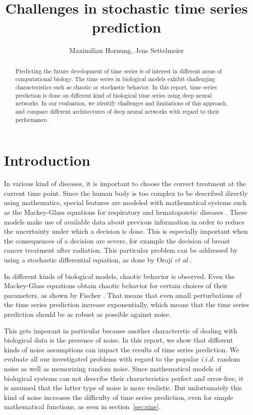 \documentclass{article}
\title{Challenges in stochastic time series prediction}
\author{Maximilian Hornung, Jens Settelmeier}
\begin{document}
\maketitle

\begin{abstract}
  Predicting the future development of time series is of interest in different
  areas of computational biology. The time series in biological models exhibit
  challenging characteristics such as chaotic or stochastic behavior. In this
  report, time series prediction is done on different kind of biological time
  series using deep neural networks. In our evaluation, we identify challenges
  and limitations of this approach, and compare different architectures of
  deep neural networks with regard to their performance.
\end{abstract}

\section{Introduction}

In various kind of diseases, it is important to choose the correct treatment at
the current time point. Since the human body is too complex to be described
directly using mathematics, special features are modeled with mathematical
systems such as the Mackey-Glass equations for respiratory and hematopoietic
diseases \cite{mackey1977}. These models make use of available data about
previous information in order to reduce the uncertainty under which a decision
is done. This is especially important when the consequences of a decision are
severe, for example the decision of breast cancer treatment after radiation.
This particular problem can be addressed by using a stochastic differential
equation, as done by Oroji \textit{et al} \cite{oroji2016}.

In different kinds of biological models, chaotic behavior is observed. Even the
Mackey-Glass equations obtain chaotic behavior for certain choices of their
parameters, as shown by Fischer \cite{farmer1982}. That means that even small
perturbations of the time series prediction increase exponentially, which means
that the time series prediction should be as robust as possible against noise.

This gets imporant in particular because another characterstic of dealing with
biological data is the presence of noise. In
this report, we show that different kinds of noise assumptions can impact the
results of time series prediction. We evaluate all our investigated problems
with regard to the popular $i.i.d.$ random noise as well as memorizing random
noise. Since mathematical models of biological systems can not describe their
characteristics perfect and error-free, it is assumed that the latter type of
noise is more realistic. But unfortunately this kind of noise increases the
difficulty of time series prediction, even for simple mathematical functions,
as seen in section~\ref{sec:sine}.
\end{document}
